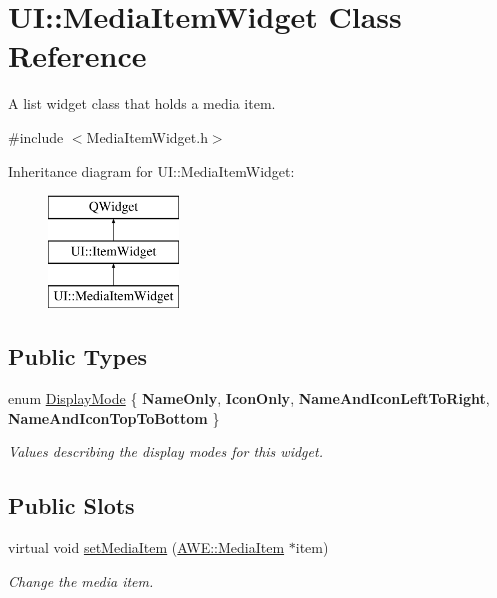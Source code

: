 \hypertarget{class_u_i_1_1_media_item_widget}{\section{U\-I\-:\-:Media\-Item\-Widget Class Reference}
\label{class_u_i_1_1_media_item_widget}
}


A list widget class that holds a media item.  




{\ttfamily \#include $<$Media\-Item\-Widget.\-h$>$}

Inheritance diagram for U\-I\-:\-:Media\-Item\-Widget\-:\begin{figure}[H]
\begin{center}
\leavevmode
\includegraphics[height=3.000000cm]{class_u_i_1_1_media_item_widget}
\end{center}
\end{figure}
\subsection*{Public Types}
\begin{DoxyCompactItemize}
\item 
enum \hyperlink{class_u_i_1_1_media_item_widget_aa1dc4a9a9dc77d8bd367fca6d8d6a35a}{Display\-Mode} \{ {\bfseries Name\-Only}, 
{\bfseries Icon\-Only}, 
{\bfseries Name\-And\-Icon\-Left\-To\-Right}, 
{\bfseries Name\-And\-Icon\-Top\-To\-Bottom}
 \}
\begin{DoxyCompactList}\small\item\em Values describing the display modes for this widget. \end{DoxyCompactList}\end{DoxyCompactItemize}
\subsection*{Public Slots}
\begin{DoxyCompactItemize}
\item 
virtual void \hyperlink{class_u_i_1_1_media_item_widget_a8d7aecdd4973a962746724dc095a52a8}{set\-Media\-Item} (\hyperlink{class_a_w_e_1_1_media_item}{A\-W\-E\-::\-Media\-Item} $\ast$item)
\begin{DoxyCompactList}\small\item\em Change the media item. \end{DoxyCompactList}\end{DoxyCompactItemize}
